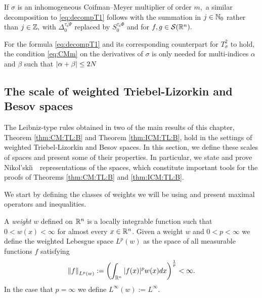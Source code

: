 If $\sigma$ is an inhomogeneous Coifman--Meyer multiplier of order $m,$ a similar decomposition to \eqref{eq:decompT1} follows  with the summation in $j\in\mathbb{N}_0$ rather than $j\in\mathbb{Z},$  with  $\Delta_0^{\tau_a \Psi}$ replaced by $S_0^{\tau_a\Phi}$ and for $f,g\in {\mathcal{S}}({{\mathbb R}^n}).$


\begin{remark}\label{re:numderiv1} For the formula \eqref{eq:decompT1}  and its corresponding counterpart for $T^2_\sigma$ to hold, the condition \eqref{eq:CMm} on the derivatives of $\sigma$ is only needed for multi-indices $\alpha$ and $\beta$ such that  $\left\vert \alpha+\beta \right\vert\le 2N$
\end{remark}


\subsection{The scale of weighted Triebel-Lizorkin and Besov spaces}\label{sec:weighted_TL_B}

The Leibniz-type rules obtained in two of the main results of this chapter, Theorem \ref{thm:CM:TL:B} and Theorem \ref{thm:ICM:TL:B}, hold in the settings of weighted Triebel-Lizorkin and Besov spaces. In this section, we define these scales of spaces and present some of their properties. In particular, we state and prove Nikol'ski\u\i$\text{ }$ representations of the spaces, which constitute important tools for the proofs of Theorems \ref{thm:CM:TL:B} and \ref{thm:ICM:TL:B}.

We start by defining the classes of weights we will be using and present maximal operators and inequalities.

A \textit{weight} $w$ defined on ${{\mathbb R}^n}$ is a locally integrable function such that $0<w(x)<\infty$ for almost every $x\in{{\mathbb R}^n}$.
Given a weight $w$ and $0<p<\infty$ we define the weighted Lebesgue space $L^p(w)$ as the space of all measurable functions $f$ satisfying 
\[ \left\|f\right\|_{L^p(w)} := \left(\int_{{\mathbb R}^n} |f(x)|^p w(x)dx\right)^{\frac{1}{p}} < \infty. \]
In the case that $p=\infty$ we define $L^\infty (w) := L^\infty$. 

